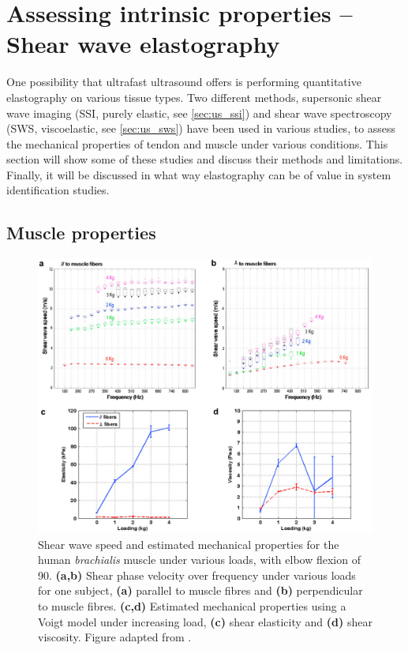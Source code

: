 \section{Assessing intrinsic properties -- Shear wave elastography}
One possibility that ultrafast ultrasound offers is performing quantitative elastography on various tissue types. Two different methods, supersonic shear wave imaging (SSI, purely elastic, see \autoref{sec:us_ssi}) and shear wave spectroscopy (SWS, viscoelastic, see \ref{sec:us_sws}) have been used in various studies, to assess the mechanical properties of tendon and muscle under various conditions. This section will show some of these studies and discuss their methods and limitations. Finally, it will be discussed in what way elastography can be of value in system identification studies. 



\subsection{Muscle properties}

\begin{figure}[t]
	\centering
	\includegraphics[width=.90\linewidth]{Figures/elastography/gennisson_dispersion2.png}
	\caption{Shear wave speed and estimated mechanical properties for the human \textit{brachialis} muscle under various loads, with elbow flexion of \SI{90}{\deg}. \textbf{(a,b)} Shear phase velocity over frequency under various loads for one subject, \textbf{(a)} parallel to muscle fibres and \textbf{(b)} perpendicular to muscle fibres. \textbf{(c,d)} Estimated mechanical properties using a Voigt model under increasing load, \textbf{(c)} shear elasticity and \textbf{(d)} shear viscosity. Figure adapted from \citet{gennisson_viscoelastic_2010}.}
	\label{fig:rem_gennisson_dispersion_force}
\end{figure}


